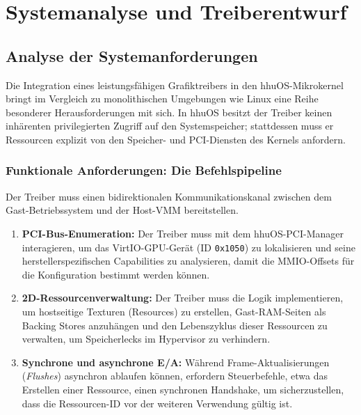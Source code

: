 \chapter{Systemanalyse und Treiberentwurf}

\section{Analyse der Systemanforderungen}
Die Integration eines leistungsfähigen Grafiktreibers in den hhuOS-Mikrokernel
bringt im Vergleich zu monolithischen Umgebungen wie Linux eine Reihe
besonderer Herausforderungen mit sich. In hhuOS besitzt der Treiber keinen
inhärenten privilegierten Zugriff auf den Systemspeicher; stattdessen muss er
Ressourcen explizit von den Speicher- und PCI-Diensten des Kernels anfordern.

\subsection{Funktionale Anforderungen: Die Befehlspipeline}
Der Treiber muss einen bidirektionalen Kommunikationskanal zwischen dem
Gast-Betriebssystem und der Host-VMM bereitstellen.
\begin{enumerate}[label=\arabic*.]
    \item \textbf{PCI-Bus-Enumeration:} Der Treiber muss mit dem hhuOS-PCI-Manager interagieren, um das VirtIO-GPU-Gerät (ID \texttt{0x1050}) zu lokalisieren und seine herstellerspezifischen Capabilities zu analysieren, damit die MMIO-Offsets für die Konfiguration bestimmt werden können.
    \item \textbf{2D-Ressourcenverwaltung:} Der Treiber muss die Logik implementieren, um hostseitige Texturen (Resources) zu erstellen, Gast-RAM-Seiten als Backing Stores anzuhängen und den Lebenszyklus dieser Ressourcen zu verwalten, um Speicherlecks im Hypervisor zu verhindern.
    \item \textbf{Synchrone und asynchrone E/A:} Während Frame-Aktualisierungen (\textit{Flushes}) asynchron ablaufen können, erfordern Steuerbefehle, etwa das Erstellen einer Ressource, einen synchronen Handshake, um sicherzustellen, dass die Ressourcen-ID vor der weiteren Verwendung gültig ist.
\end{enumerate}

